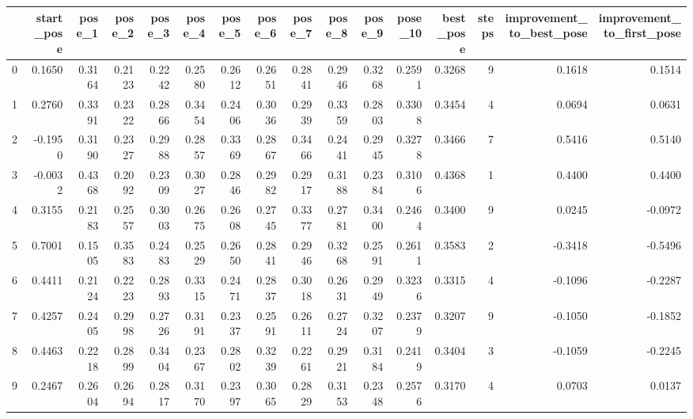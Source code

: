 \begin{tabular}{lrrrrrrrrrrrrrrr}
\toprule
{} &  start\_pose &  pose\_1 &  pose\_2 &  pose\_3 &  pose\_4 &  pose\_5 &  pose\_6 &  pose\_7 &  pose\_8 &  pose\_9 &  pose\_10 &  best\_pose &  steps &  improvement\_to\_best\_pose &  improvement\_to\_first\_pose \\
\midrule
0   &      0.1650 &  0.3164 &  0.2123 &  0.2242 &  0.2580 &  0.2612 &  0.2651 &  0.2841 &  0.2946 &  0.3268 &   0.2591 &     0.3268 &      9 &                    0.1618 &                     0.1514 \\
1   &      0.2760 &  0.3391 &  0.2322 &  0.2866 &  0.3454 &  0.2406 &  0.3036 &  0.2939 &  0.3359 &  0.2803 &   0.3308 &     0.3454 &      4 &                    0.0694 &                     0.0631 \\
2   &     -0.1950 &  0.3190 &  0.2327 &  0.2988 &  0.2857 &  0.3369 &  0.2867 &  0.3466 &  0.2441 &  0.2945 &   0.3278 &     0.3466 &      7 &                    0.5416 &                     0.5140 \\
3   &     -0.0032 &  0.4368 &  0.2092 &  0.2309 &  0.3027 &  0.2846 &  0.2982 &  0.2917 &  0.3188 &  0.2384 &   0.3106 &     0.4368 &      1 &                    0.4400 &                     0.4400 \\
4   &      0.3155 &  0.2183 &  0.2557 &  0.3003 &  0.2675 &  0.2608 &  0.2745 &  0.3377 &  0.2781 &  0.3400 &   0.2464 &     0.3400 &      9 &                    0.0245 &                    -0.0972 \\
5   &      0.7001 &  0.1505 &  0.3583 &  0.2483 &  0.2529 &  0.2650 &  0.2841 &  0.2946 &  0.3268 &  0.2591 &   0.2611 &     0.3583 &      2 &                   -0.3418 &                    -0.5496 \\
6   &      0.4411 &  0.2124 &  0.2223 &  0.2893 &  0.3315 &  0.2471 &  0.2837 &  0.3018 &  0.2631 &  0.2949 &   0.3236 &     0.3315 &      4 &                   -0.1096 &                    -0.2287 \\
7   &      0.4257 &  0.2405 &  0.2998 &  0.2726 &  0.3191 &  0.2337 &  0.2591 &  0.2611 &  0.2724 &  0.3207 &   0.2379 &     0.3207 &      9 &                   -0.1050 &                    -0.1852 \\
8   &      0.4463 &  0.2218 &  0.2899 &  0.3404 &  0.2367 &  0.2802 &  0.3239 &  0.2261 &  0.2921 &  0.3184 &   0.2419 &     0.3404 &      3 &                   -0.1059 &                    -0.2245 \\
9   &      0.2467 &  0.2604 &  0.2694 &  0.2817 &  0.3170 &  0.2397 &  0.3065 &  0.2829 &  0.3153 &  0.2348 &   0.2576 &     0.3170 &      4 &                    0.0703 &                     0.0137 \\

\end{tabular}
